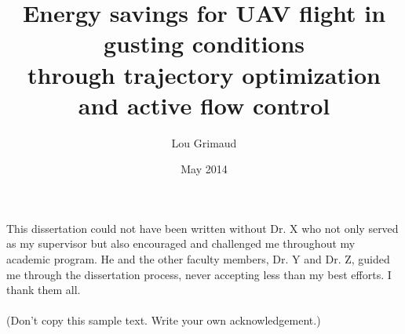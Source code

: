 \documentclass{iitthesis}
\begin{document}
\title{Energy savings for UAV flight in gusting conditions \\
through trajectory optimization \\
and active flow control}
\author{Lou Grimaud}
\date{May 2014}
\maketitle                %


\prelimpages         %


\begin{acknowledgement}     %
\par  This dissertation could not have been written without Dr. X
who not only served as my supervisor but also encouraged and
challenged me throughout my academic program. He and the other
faculty members, Dr. Y and Dr. Z, guided me through the
dissertation process, never accepting less than my best efforts. I
thank them all.\\ \\ (Don't copy this sample text. Write your own
acknowledgement.)
\end{acknowledgement}


\tableofcontents
\clearpage

\listoftables

\clearpage

\listoffigures

\clearpage


\listofsymbols


 \clearpage


\begin{abstract}           %
\end{abstract}
\end{document}
